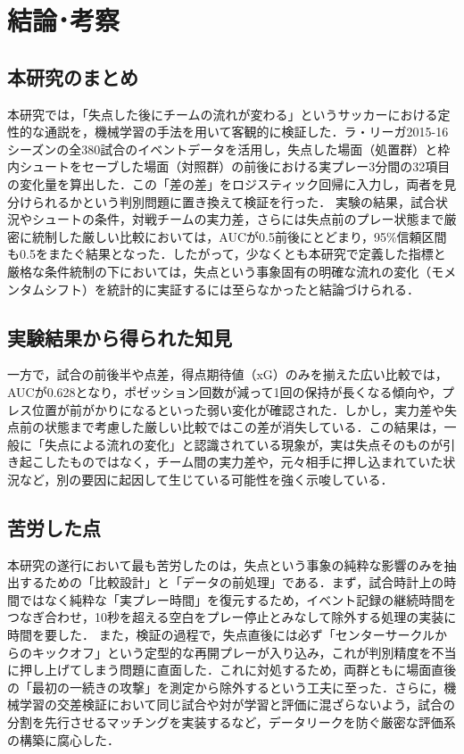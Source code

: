 \documentclass[11pt]{ujarticle} %
\begin{document}
\section{結論･考察}

\subsection{本研究のまとめ}
本研究では，「失点した後にチームの流れが変わる」というサッカーにおける定性的な通説を，機械学習の手法を用いて客観的に検証した．ラ・リーガ2015-16シーズンの全380試合のイベントデータを活用し，失点した場面（処置群）と枠内シュートをセーブした場面（対照群）の前後における実プレー3分間の32項目の変化量を算出した．この「差の差」をロジスティック回帰に入力し，両者を見分けられるかという判別問題に置き換えて検証を行った．
実験の結果，試合状況やシュートの条件，対戦チームの実力差，さらには失点前のプレー状態まで厳密に統制した厳しい比較においては，AUCが0.5前後にとどまり，95\%信頼区間も0.5をまたぐ結果となった．したがって，少なくとも本研究で定義した指標と厳格な条件統制の下においては，失点という事象固有の明確な流れの変化（モメンタムシフト）を統計的に実証するには至らなかったと結論づけられる．

\subsection{実験結果から得られた知見}
一方で，試合の前後半や点差，得点期待値（xG）のみを揃えた広い比較では，AUCが0.628となり，ポゼッション回数が減って1回の保持が長くなる傾向や，プレス位置が前がかりになるといった弱い変化が確認された．しかし，実力差や失点前の状態まで考慮した厳しい比較ではこの差が消失している．この結果は，一般に「失点による流れの変化」と認識されている現象が，実は失点そのものが引き起こしたものではなく，チーム間の実力差や，元々相手に押し込まれていた状況など，別の要因に起因して生じている可能性を強く示唆している．

\subsection{苦労した点}
本研究の遂行において最も苦労したのは，失点という事象の純粋な影響のみを抽出するための「比較設計」と「データの前処理」である．まず，試合時計上の時間ではなく純粋な「実プレー時間」を復元するため，イベント記録の継続時間をつなぎ合わせ，10秒を超える空白をプレー停止とみなして除外する処理の実装に時間を要した．
また，検証の過程で，失点直後には必ず「センターサークルからのキックオフ」という定型的な再開プレーが入り込み，これが判別精度を不当に押し上げてしまう問題に直面した．これに対処するため，両群ともに場面直後の「最初の一続きの攻撃」を測定から除外するという工夫に至った．さらに，機械学習の交差検証において同じ試合や対が学習と評価に混ざらないよう，試合の分割を先行させるマッチングを実装するなど，データリークを防ぐ厳密な評価系の構築に腐心した．
\end{document}
